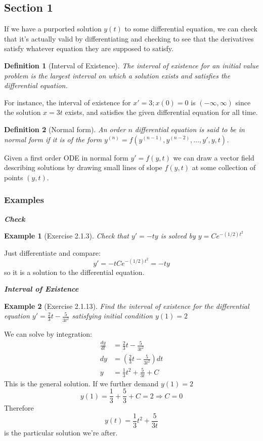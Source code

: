 \documentclass[14pt]{article}
\newtheorem{defn}{Definition}
\newtheorem{ex}{Example}
\newcommand{\type}[1]{\begin{center} \emph{\textbf{#1}} \end{center}}
\begin{document}
\subsection{Section 1}

If we have a purported solution $y(t)$ to some differential equation, we can check that it's
actually valid by differentiating and checking to see that the derivatives satisfy whatever equation
they are supposed to satisfy.

\begin{defn}[Interval of Existence]
  The \emph{interval of existence} for an initial value problem is the largest interval on which a
  solution exists and satisfies the differential equation.
\end{defn}

For instance, the interval of existence for $x' =3; x(0)=0$ is $(-\infty, \infty)$ since the
solution $x = 3t$ exists, and satisfies the given differential equation for all time.


\begin{defn}[Normal form]
  An order $n$ differential equation is said to be in \emph{normal form} if it is of the form $y^{(n)} = f(y^{(n-1)}, y^{(n-2)}, \dots, y',y,t)$.
\end{defn}

Given a first order ODE in normal form $y' = f(y,t)$ we can draw a vector field describing solutions
by drawing small lines of slope $f(y,t)$ at some collection of points $(y,t)$.

\subsubsection*{Examples}

\type{Check}
\begin{ex}[Exercise 2.1.3] Check that $y' = -ty$ is solved by $y = C e ^{-(1/2) t^2}$\end{ex}

Just differentiate and compare:
\[y' = -t C e^{-(1/2) t^2} = -t y\]
so it is a solution to the differential equation.

\type{Interval of Existence}
\begin{ex}[Exercise 2.1.13] Find the interval of existence for the differential equation $y' =
  \frac{2}{3} t - \frac{5}{3 t^2}  $ satisfying initial condition $y(1) = 2$ \end{ex}

We can solve by integration:
\begin{align*}
\frac{dy}{dt}  &= \frac{2}{3} t - \frac{5}{3 t^2}\\
dy &= \left( \frac{2}{3} t - \frac{5}{3 t^2} \right) dt\\
y &= \frac{1}{3} t^2 + \frac{5}{3t} + C
\end{align*}
This is the general solution. If we further demand $y(1) = 2$
\[y(1) = \frac{1}{3} + \frac{5}{3} + C = 2 \Rightarrow C = 0\]
Therefore
\[y(t) = \frac{1}{3} t^2 + \frac{5}{3 t} \]
is the particular solution we're after.
\end{document}
